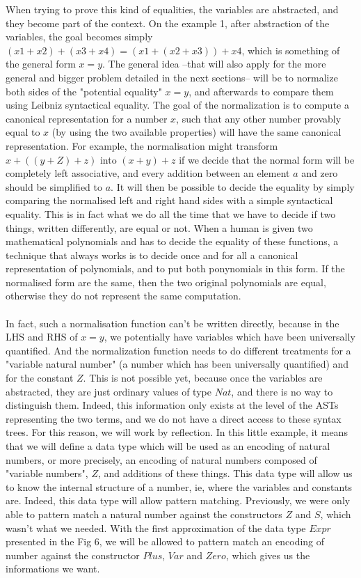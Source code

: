 When trying to prove this kind of equalities, the variables are abstracted, and they become part of the context. On the example 1, after abstraction of the variables, the goal becomes simply $(x1 + x2) + (x3 + x4) = (x1 + (x2 + x3)) + x4$, which is something of the general form $x=y$.
The general idea --that will also apply for the more general and bigger problem detailed in the next sections-- will be to normalize both sides of the "potential equality" $x=y$, and afterwards to compare them using Leibniz syntactical equality.
The goal of the normalization is to compute a canonical representation for a number $x$, such that any other number provably equal to $x$ (by using the two available properties) will have the same canonical representation. For example, the normalisation might transform $x+((y+Z)+z)$ into $(x+y)+z$ if we decide that the normal form will be completely left associative, and every addition between an element $a$ and zero should be simplified to $a$. It will then be possible to decide the equality by simply comparing the normalised left and right hand sides with a simple syntactical equality. This is in fact what we do all the time that we have to decide if two things, written differently, are equal or not. When a human is given two mathematical polynomials and has to decide the equality of these functions, a technique that always works is to decide once and for all a canonical representation of polynomials, and to put both ponynomials in this form. If the normalised form are the same, then the two original polynomials are equal, otherwise they do not represent the same computation.\\
\\
In fact, such a normalisation function can't be written directly, because in the LHS and RHS of $x=y$, we potentially have variables which have been universally quantified. And the normalization function needs to do different treatments for a "variable natural number" (a number which has been universally quantified) and for the constant $Z$. This is not possible yet, because once the variables are abstracted, they are just ordinary values of type $Nat$, and there is no way to distinguish them. Indeed, this information only exists at the level of the ASTs representing the two terms, and we do not have a direct access to these syntax trees.
For this reason, we will work by reflection. In this little example, it means that we will define a data type which will be used as an encoding of natural numbers, or more precisely, an encoding of natural numbers composed of "variable numbers", $Z$, and additions of these things. This data type will allow us to know the internal structure of a number, ie, where the variables and constants are.
Indeed, this data type will allow pattern matching. Previously, we were only able to pattern match a natural number against the constructors $Z$ and $S$, which wasn't what we needed.  With the first approximation of the data type $Expr$ presented in the Fig 6, we will be allowed to pattern match an encoding of number against the constructor $Plus$, $Var$ and $Zero$, which gives us the informations we want.


